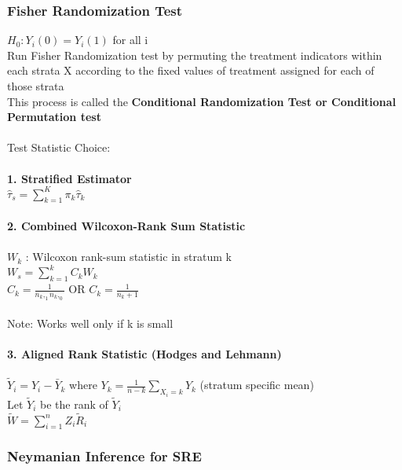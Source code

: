 \subsubsection{Fisher Randomization Test}
$H_0: Y_i(0) = Y_i(1)$ for all i \\
Run Fisher Randomization test by permuting the treatment indicators within each strata X according to the fixed values of treatment assigned for each of those strata \\
This process is called the \textbf{Conditional Randomization Test or Conditional Permutation test}\\
\\
Test Statistic Choice: \\
\\
\textbf{1. Stratified Estimator\\}
$\hat{\tau}_s = \sum_{k=1}^{K} \pi_k \hat{\tau}_k$\\
\\
\textbf{2. Combined Wilcoxon-Rank Sum Statistic\\}
\\
$W_k$ : Wilcoxon rank-sum statistic in stratum k
\\$W_s = \sum_{k=1}^{k}C_k W_k$
\\$C_k = \frac{1}{n_k,_1 n_k,_0}$ OR $C_k = \frac{1}{n_k + 1}$\\
\\Note: Works well only if k is small
\\
\\\textbf{3. Aligned Rank Statistic (Hodges and Lehmann)} \\
\\$\tilde{Y}_i = Y_i - \bar{Y}_k$ where $Y_k = \frac{1}{n-k} \sum_{X_i = k} Y_k$ (stratum specific mean)
\\Let $\tilde{Y}_i$ be the rank of $\tilde{Y}_i$
\\ $\tilde{W} = \sum_{i=1} ^ {n} Z_i \tilde{R}_i$

\subsubsection{Neymanian Inference for SRE}

